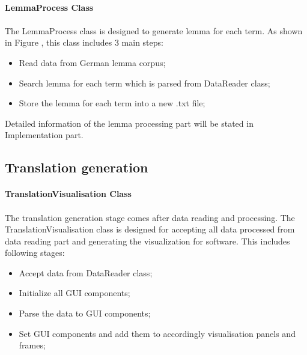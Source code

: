 \paragraph{LemmaProcess Class}

\paragraph[]{}
The LemmaProcess class is designed to generate lemma for each term. As shown in Figure \label{lemma}, this class includes 3 main steps:
\begin{itemize}
	\item \textbf{}Read data from German lemma corpus;
	\item \textbf{}Search lemma for each term which is parsed from DataReader class;
	\item \textbf{}Store the lemma for each term into a new .txt file;
\end{itemize} 
Detailed information of the lemma processing part will be stated in Implementation part. 

\subsection{Translation generation}

\paragraph{TranslationVisualisation Class}

\paragraph[]{}The translation generation stage comes after data reading and processing. The TranslationVisualisation class is designed for accepting all data processed from data reading part and generating the visualization for software. This includes following stages:
\begin{itemize}
	\item \textbf{}Accept data from DataReader class;
	\item \textbf{}Initialize all GUI components;
	\item \textbf{}Parse the data to GUI components;
	\item \textbf{}Set GUI components and add them to accordingly visualisation panels and frames;

\end{itemize}  

